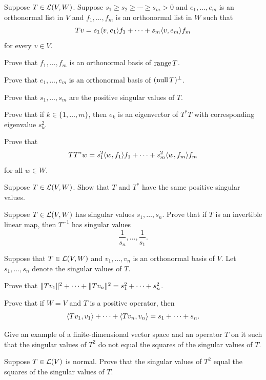 \begin{exc}
\begin{exercise}
Suppose $T\in\mathcal{L}(V,W)$. Suppose $s_1\ge s_2\ge\cdots\ge s_m>0$ and
$e_1,\dots,e_m$ is an orthonormal list in $V$ and $f_1,\dots,f_m$ is an
orthonormal list in $W$ such that
\[ Tv = s_1\langle v, e_1 \rangle f_1+\cdots+s_m\langle v, e_m \rangle f_m \]
for every $v\in V$.
\begin{parts}
\item Prove that $f_1,\dots,f_m$ is an orthonormal basis of $\operatorname{range} T$.
\item Prove that $e_1,\dots,e_m$ is an orthonormal basis of $(\operatorname{null} T)^\perp$.
\item Prove that $s_1,\dots,s_m$ are the positive singular values of $T$.
\item Prove that if $k\in\{1,\dots,m\}$, then $e_k$ is an eigenvector of
  $T^*T$ with corresponding eigenvalue $s_k^2$.
\item Prove that
  \[ TT^*w = s_1^2\langle w, f_1 \rangle f_1+\cdots+s_m^2\langle w, f_m \rangle f_m \]
  for all $w\in W$.
\end{parts}
\end{exercise}

\begin{exercise}
Suppose $T\in\mathcal{L}(V,W)$. Show that $T$ and $T^*$ have the same positive
singular values.
\end{exercise}

\begin{exercise}
Suppose $T\in\mathcal{L}(V,W)$ has singular values $s_1,\dots,s_n$. Prove that if $T$
is an invertible linear map, then $T^{-1}$ has singular values
\[ \frac{1}{s_n},\dots,\frac{1}{s_1}. \]
\end{exercise}

\begin{exercise}
Suppose that $T\in\mathcal{L}(V,W)$ and $v_1,\dots,v_n$ is an orthonormal basis of
$V$. Let $s_1,\dots,s_n$ denote the singular values of $T$.
\begin{parts}
\item Prove that $\lVert Tv_1 \rVert^2+\cdots+\lVert Tv_n \rVert^2=s_1^2+\cdots+s_n^2$.
\item Prove that if $W=V$ and $T$ is a positive operator, then
  \[ \langle Tv_1, v_1 \rangle+\cdots+\langle Tv_n, v_n \rangle = s_1+\cdots+s_n. \]
\end{parts}
\end{exercise}

\begin{exercise}\leavevmode
\begin{parts}
\item Give an example of a finite-dimensional vector space and an operator $T$
  on it such that the singular values of $T^2$ do not equal the squares of the
  singular values of $T$.
\item Suppose $T\in\mathcal{L}(V)$ is normal. Prove that the singular values of $T^2$
  equal the squares of the singular values of $T$.
\end{parts}
\end{exercise}


\end{exc}
